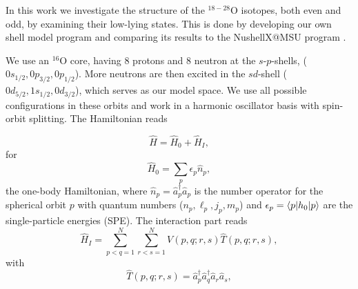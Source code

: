 \documentclass[aps,prl,reprint,groupedaddress]{revtex4-1}  %
\begin{document}
In this work we investigate the structure of the $^{18-28}$O isotopes, both even and odd, by examining their low-lying states. This is done by developing our own shell model program and comparing its results to the NushellX@MSU program \cite{Brown2014}.

We use an $^{16}$O core, having 8 protons and 8 neutron at the $s$-$p$-shells, ($0s_{1/2},0p_{3/2},0p_{1/2}$). 
More neutrons are then excited in the $sd$-shell ($0d_{5/2},1s_{1/2},0d_{3/2}$), which serves as our model space. We use all possible configurations in these orbits and work in a harmonic oscillator basis with spin-orbit splitting. 
The Hamiltonian reads

		\begin{equation} \label{eq:H}
		\hat H = \hat H_0 + \hat H_I,
		\end{equation}
for
		\begin{equation} \label{eq:H_0}
		\hat H_0 = \sum_{p} \epsilon_p \hat n_{p},
		\end{equation}
the one-body Hamiltonian, where $\hat n_p = \hat a_p^\dagger \hat a_p$ is the number operator for the spherical orbit $p$ with quantum numbers ($n_p,\ell_p,j_p,m_p$) and $\epsilon_p = \braket{p|h_0|p}$ are the single-particle energies (SPE). The interaction part reads
		\begin{equation} \label{eq:V}
		\hat H_I = \sum_{p < q=1}^{N} \sum_{r < s=1}^{N} V(p,q;r,s) \hat T(p,q;r,s),
		\end{equation}
		with
		\begin{equation} \label{eq:P}
		\hat T(p,q;r,s)  = \hat a_p^\dagger \hat a_q^\dagger \hat a_r \hat a_s,
		\end{equation}
\end{document}

